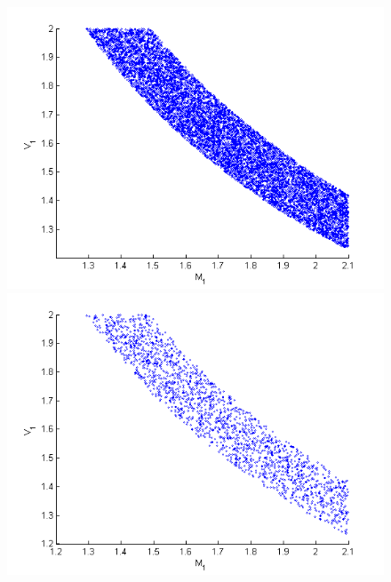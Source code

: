 \documentclass{article}
\newcommand{\nn}{0.16}
\begin{document}
\begin{figure}
\begin{center}
\begin{minipage}[b]{\nn\textwidth}
                \includegraphics[width=1\textwidth]{Figs2/col_c_gibbs10000.png}
        \end{minipage}%
\begin{minipage}[b]{\nn\textwidth}
                \includegraphics[width=1\textwidth]{Figs2/col-c-mh-10000_08.png}
        \end{minipage}%

\end{center}
\end{figure}
\end{document}
